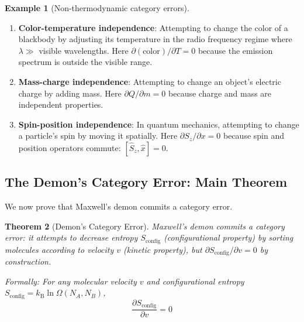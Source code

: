 \documentclass[10pt,twocolumn,letterpaper]{article}
\newtheorem{theorem}{Theorem}[section]
\theoremstyle{definition}
\newtheorem{example}[theorem]{Example}
\theoremstyle{remark}
\newcommand{\kb}{k_\text{B}}
\newcommand{\pderiv}[2]{\frac{\partial #1}{\partial #2}}
\newcommand{\Om}{\Omega}
\begin{document}
\begin{example}[Non-thermodynamic category errors]
\begin{enumerate}
\item \textbf{Color-temperature independence}: Attempting to change the color of a blackbody by adjusting its temperature in the radio frequency regime where $\lambda \gg$ visible wavelengths. Here $\partial(\text{color})/\partial T = 0$ because the emission spectrum is outside the visible range.

\item \textbf{Mass-charge independence}: Attempting to change an object's electric charge by adding mass. Here $\partial Q/\partial m = 0$ because charge and mass are independent properties.

\item \textbf{Spin-position independence}: In quantum mechanics, attempting to change a particle's spin by moving it spatially. Here $\partial S_z/\partial x = 0$ because spin and position operators commute: $[\hat{S}_z, \hat{x}] = 0$.
\end{enumerate}
\end{example}

\subsection{The Demon's Category Error: Main Theorem}

We now prove that Maxwell's demon commits a category error.

\begin{theorem}[Demon's Category Error]
\label{thm:demon_category_error}
Maxwell's demon commits a category error: it attempts to decrease entropy $S_{\text{config}}$ (configurational property) by sorting molecules according to velocity $v$ (kinetic property), but $\partial S_{\text{config}}/\partial v = 0$ by construction.

Formally: For any molecular velocity $v$ and configurational entropy $S_{\text{config}} = \kb \ln \Om(N_A, N_B)$,
\begin{equation}
\pderiv{S_{\text{config}}}{v} = 0
\label{eq:demon_category_error}
\end{equation}
\end{theorem}
\end{document}
